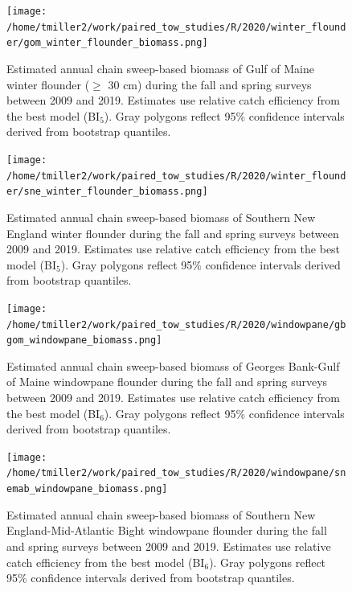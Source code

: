 \documentclass[12pt,letterpaper, leqno]{article}
\begin{document}
\begin{figure}
\caption{Estimated annual chain sweep-based biomass of Gulf of Maine winter flounder ($\geq$ 30 cm) during the fall and spring surveys between 2009 and 2019. Estimates use relative catch efficiency from the best model (BI$_5$). Gray polygons reflect 95\% confidence intervals derived from bootstrap quantiles.}\label{gom_winter_flounder_biomass}
\begin{center}
\texttt{[image: /home/tmiller2/work/paired\_tow\_studies/R/2020/winter\_flounder/gom\_winter\_flounder\_biomass.png]}
\end{center}
\end{figure}

\begin{figure}
\caption{Estimated annual chain sweep-based biomass of Southern New England winter flounder during the fall and spring surveys between 2009 and 2019. Estimates use relative catch efficiency from the best model (BI$_5$). Gray polygons reflect 95\% confidence intervals derived from bootstrap quantiles.}\label{sne_winter_flounder_biomass}
\begin{center}
\texttt{[image: /home/tmiller2/work/paired\_tow\_studies/R/2020/winter\_flounder/sne\_winter\_flounder\_biomass.png]}
\end{center}
\end{figure}

\begin{figure}
\caption{Estimated annual chain sweep-based biomass of Georges Bank-Gulf of Maine windowpane flounder during the fall and spring surveys between 2009 and 2019. Estimates use relative catch efficiency from the best model (BI$_6$). Gray polygons reflect 95\% confidence intervals derived from bootstrap quantiles.}\label{gbgom_windowpane_biomass}
\begin{center}
\texttt{[image: /home/tmiller2/work/paired\_tow\_studies/R/2020/windowpane/gbgom\_windowpane\_biomass.png]}
\end{center}
\end{figure}

\begin{figure}
\caption{Estimated annual chain sweep-based biomass of Southern New England-Mid-Atlantic Bight windowpane flounder during the fall and spring surveys between 2009 and 2019. Estimates use relative catch efficiency from the best model (BI$_6$). Gray polygons reflect 95\% confidence intervals derived from bootstrap quantiles.}\label{snemab_windowpane_biomass}
\begin{center}
\texttt{[image: /home/tmiller2/work/paired\_tow\_studies/R/2020/windowpane/snemab\_windowpane\_biomass.png]}
\end{center}
\end{figure}
\end{document}
